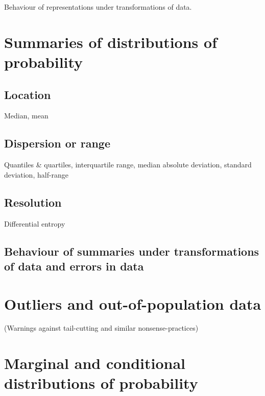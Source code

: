 \documentclass[
  a4paper,
  DIV=11,
  numbers=noendperiod,
  oneside]{scrreprt}
\begin{document}
Behaviour of representations under transformations of data.

\hypertarget{summaries-of-distributions-of-probability}{%
\section{Summaries of distributions of
probability}\label{summaries-of-distributions-of-probability}}

\hypertarget{location}{%
\subsection{Location}\label{location}}

Median, mean

\hypertarget{dispersion-or-range}{%
\subsection{Dispersion or range}\label{dispersion-or-range}}

Quantiles \& quartiles, interquartile range, median absolute deviation,
standard deviation, half-range

\hypertarget{resolution}{%
\subsection{Resolution}\label{resolution}}

Differential entropy

\hypertarget{behaviour-of-summaries-under-transformations-of-data-and-errors-in-data}{%
\subsection{Behaviour of summaries under transformations of data and
errors in
data}\label{behaviour-of-summaries-under-transformations-of-data-and-errors-in-data}}

\hypertarget{outliers-and-out-of-population-data}{%
\section{Outliers and out-of-population
data}\label{outliers-and-out-of-population-data}}

(Warnings against tail-cutting and similar nonsense-practices)

\hypertarget{marginal-and-conditional-distributions-of-probability}{%
\section{Marginal and conditional distributions of
probability}\label{marginal-and-conditional-distributions-of-probability}}
\end{document}

